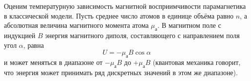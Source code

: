 %



Оценим температурную зависимость магнитной восприимчивости парамагнетика
в классической модели. Пусть
среднее число атомов в единице объёма равно $n$, а абсолютная величина
магнитного момента атома $\mu_{\text{а}}$.
В магнитном поле с индукцией $B$ энергия магнитного диполя,
составляющего с направлением поля угол $\alpha$, равна
\begin{equation*}
	U = - \mu_{\text{а}}B \cos \alpha
\end{equation*}
и может меняться в диапазоне от $-\mu_{а}B$ до $+\mu_{а}B$
(квантовая механика говорит, что энергия может принимать
ряд дискретных значений в этом же диапазоне).

